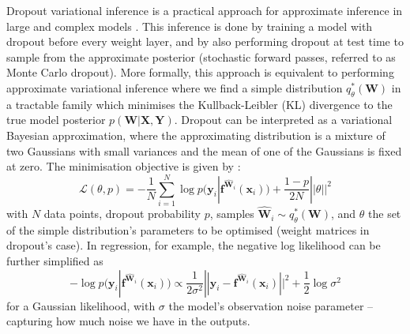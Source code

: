 \documentclass{article}
\newcommand{\cL}{\mathcal{L}}
\newcommand{\f}{\mathbf{f}}
\newcommand{\x}{\mathbf{x}}
\newcommand{\y}{\mathbf{y}}
\newcommand{\W}{\mathbf{W}}
\newcommand{\X}{\mathbf{X}}
\newcommand{\Y}{\mathbf{Y}}
\newcommand{\Wh}{{\widehat{\mathbf{W}}}}
\begin{document}
Dropout variational inference is a practical approach for approximate inference in large and complex models \citep{Gal2016Bayesian}. 
This inference is done by training a model with dropout before every weight layer, and by also performing dropout at test time to sample from the approximate posterior (stochastic forward passes, referred to as Monte Carlo dropout).
More formally, this approach is equivalent to performing approximate variational inference where we find a simple distribution $q_\theta^*(\W)$ in a tractable family which minimises the Kullback-Leibler (KL) divergence to the true model posterior $p(\W | \X, \Y)$. 
Dropout can be interpreted as a variational Bayesian approximation, where the approximating distribution is a mixture of two Gaussians with small variances and the mean of one of the Gaussians is fixed at zero. 
The minimisation objective is given by \citep{jordan1999introduction}:
\begin{equation}  
\cL(\theta, p) = - \frac{1}{N} \sum_{i=1}^N \log p(\y_i | \f^{\Wh_i}(\x_i)) + \frac{1 - p}{2N} ||\theta||^2
\end{equation}
with $N$ data points, dropout probability $p$, samples $\Wh_i \sim q_\theta^*(\W)$, and $\theta$ the set of the simple distribution's parameters to be optimised (weight matrices in dropout's case). In regression, for example, the negative log likelihood can be further simplified as
\begin{equation}
-\log p(\y_i | \f^{\Wh_i}(\x_i)) \propto  \frac{1}{2 \sigma^2}||\y_i - \f^{\Wh_i}(\x_i)||^2 + \frac{1}{2} \log \sigma^2
\end{equation}
for a Gaussian likelihood,
with $\sigma$ the model's observation noise parameter -- capturing how much noise we have in the outputs.
\end{document}
